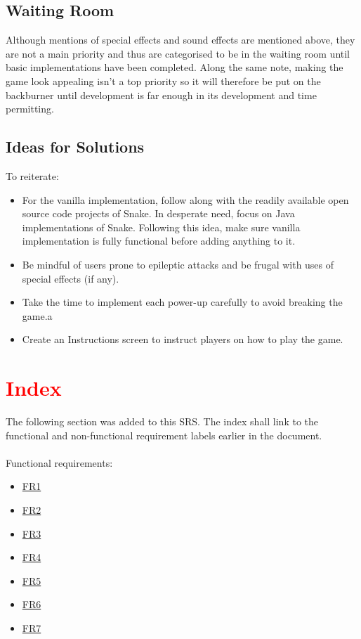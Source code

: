 \documentclass[12pt, titlepage]{article}
\begin{document}
\subsection{Waiting Room}
Although mentions of special effects and sound effects are mentioned above, they are not a main priority and thus are categorised to be in the waiting room until basic implementations have been completed. Along the same note, making the game look appealing isn't a top priority so it will therefore be put on the backburner until development is far enough in its development and time permitting. 

\subsection{Ideas for Solutions}
To reiterate:
\begin{itemize}
	\item For the vanilla implementation, follow along with the readily available open source code projects of Snake. In desperate need, focus on Java implementations of Snake. Following this idea, make sure vanilla implementation is fully functional before adding anything to it.
	\item Be mindful of users prone to epileptic attacks and be frugal with uses of special effects (if any). 
	\item Take the time to implement each power-up carefully to avoid breaking the game.a
	\item Create an Instructions screen to instruct players on how to play the game.
\end{itemize}

\newpage
\section*{\textcolor{red}{Index}}
The following section was added to this SRS. The index shall link to the functional and non-functional requirement labels earlier in the document.\\\\

Functional requirements:
\begin{itemize}
 \item \hyperref[FR1]{FR1}
 \item \hyperref[FR2]{FR2}
 \item \hyperref[FR3]{FR3}
 \item \hyperref[FR4]{FR4}
 \item \hyperref[FR5]{FR5}
 \item \hyperref[FR6]{FR6}
 \item \hyperref[FR7]{FR7}
\end{itemize}
\end{document}
